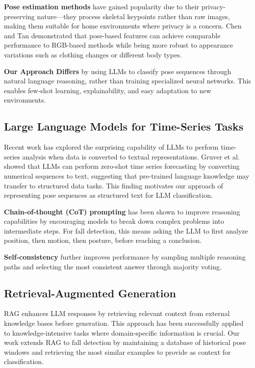 \documentclass[conference]{IEEEtran}
\begin{document}
\textbf{Pose estimation methods} have gained popularity due to their privacy-preserving nature—they process skeletal keypoints rather than raw images, making them suitable for home environments where privacy is a concern. Chen and Tan \cite{chen2020pose} demonstrated that pose-based features can achieve comparable performance to RGB-based methods while being more robust to appearance variations such as clothing changes or different body types.

\textbf{Our Approach Differs} by using LLMs to classify pose sequences through natural language reasoning, rather than training specialized neural networks. This enables few-shot learning, explainability, and easy adaptation to new environments.

\subsection{Large Language Models for Time-Series Tasks}

Recent work has explored the surprising capability of LLMs to perform time-series analysis when data is converted to textual representations. Gruver et al. \cite{gruver2023large} showed that LLMs can perform zero-shot time series forecasting by converting numerical sequences to text, suggesting that pre-trained language knowledge may transfer to structured data tasks. This finding motivates our approach of representing pose sequences as structured text for LLM classification.

\textbf{Chain-of-thought (CoT) prompting} \cite{wei2022chain} has been shown to improve reasoning capabilities by encouraging models to break down complex problems into intermediate steps. For fall detection, this means asking the LLM to first analyze position, then motion, then posture, before reaching a conclusion.

\textbf{Self-consistency} \cite{wang2022selfconsistency} further improves performance by sampling multiple reasoning paths and selecting the most consistent answer through majority voting.

\subsection{Retrieval-Augmented Generation}

RAG \cite{lewis2020retrieval} enhances LLM responses by retrieving relevant context from external knowledge bases before generation. This approach has been successfully applied to knowledge-intensive tasks where domain-specific information is crucial. Our work extends RAG to fall detection by maintaining a database of historical pose windows and retrieving the most similar examples to provide as context for classification.
\end{document}
